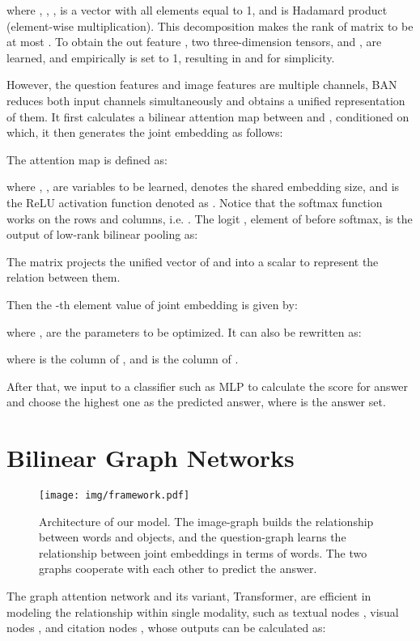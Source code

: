 \documentclass[10pt,twocolumn,letterpaper]{article}
\begin{document}
where , , ,  is a vector with all elements equal to 1, and  is Hadamard product (element-wise multiplication). This decomposition makes the rank of matrix  to be at most . To obtain the out feature , two three-dimension tensors,  and , are learned, and empirically  is set to 1, resulting in  and  for simplicity. 

However, the question features  and image features  are multiple channels, BAN \cite{kim2018bilinear} reduces both input channels simultaneously and obtains a unified representation of them. It first calculates a bilinear attention map  between  and , conditioned on which, it then generates the joint embedding  as follows:
\vspace{-5pt}

The attention map  is defined as:
\vspace{-5pt}

where , ,  are variables to be learned,  denotes the shared embedding size, and  is the ReLU activation function denoted as . Notice that the softmax function works on the rows and columns, i.e. . The logit , element of  before softmax, is the output of low-rank bilinear pooling as:
\vspace{-5pt}

The matrix  projects the unified vector of  and  into a scalar to represent the relation between them.

Then the -th element value of joint embedding  is given by:
\vspace{-5pt}

where ,  are the parameters to be optimized. It can also be rewritten as:
\vspace{-5pt}

where  is the  column of , and  is the  column of . 

After that, we input  to a classifier such as MLP to calculate the score  for answer  and choose the highest one as the predicted answer, where  is the answer set.

\section{Bilinear Graph Networks} \label{sec:bgn}
\begin{figure*}[t!]
	\centering
	\texttt{[image: img/framework.pdf]}
	\caption{Architecture of our model. The image-graph builds the relationship between words and objects, and the question-graph learns the relationship between joint embeddings in terms of words. The two graphs cooperate with each other to predict the answer.}
	\label{fig:framework}
\vspace{-5pt}
\end{figure*}
The graph attention network and its variant, Transformer, are efficient in modeling the relationship within single modality, such as textual nodes \cite{vaswani2017attention, devlin2018bert}, visual nodes \cite{chen2019graph, yang2018graph}, and citation nodes \cite{velickovic2017graph}, whose outputs can be calculated as:
\vspace{-5pt}
\end{document}
